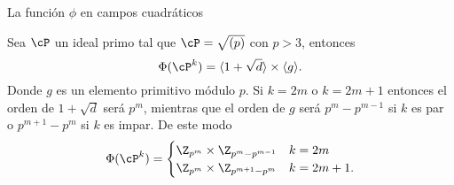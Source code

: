\begin{frame}{La función $\phi$ en campos cuadráticos}
  \begin{theorem}
    Sea $\cP$ un ideal primo tal que $\cP = \sqrt{(p)}$ con $p>3$, entonces
    \[
    \Phi(\cP^k) = \inner{1+\sqrt{d}} \times \inner{g}.
    \]
    Donde $g$ es un elemento primitivo módulo $p$. Si $k = 2m$ o $k=2m+1$ entonces el orden de $1+\sqrt{d}$ será $p^m$, mientras que el orden de $g$ será $p^m-p^{m-1}$ si $k$ es par o $p^{m+1}-p^m$ si $k$ es impar. De este modo
    \[
        \Phi(\cP^k) = \begin{cases}
            \Z_{p^m} \times \Z_{p^m - p^{m-1}} & k = 2m \\
            \Z_{p^m} \times \Z_{p^{m+1} - p^m} & k = 2m+1.
        \end{cases}
    \]
\end{theorem}
\end{frame}